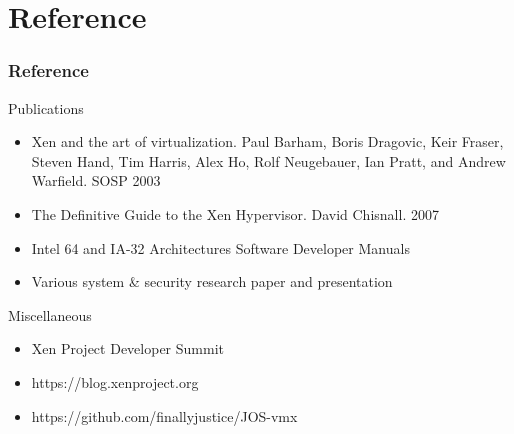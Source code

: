 \documentclass[aspectratio=169]{beamer}
\begin{document}
\section {Reference}
\begin{frame}
\frametitle{Reference}
\begin{block}{Publications}
\begin{itemize}
\item Xen and the art of virtualization. Paul Barham, Boris Dragovic, Keir Fraser, Steven Hand, Tim Harris, Alex Ho, Rolf Neugebauer, Ian Pratt, and Andrew Warfield. SOSP 2003
\item The Definitive Guide to the Xen Hypervisor. David Chisnall. 2007
\item Intel 64 and IA-32 Architectures Software Developer Manuals
\item Various system \& security research paper and presentation
\end{itemize}
\end{block}
\begin{block}{Miscellaneous}
\begin{itemize}
\item Xen Project Developer Summit
\item https://blog.xenproject.org
\item https://github.com/finallyjustice/JOS-vmx
\end{itemize}
\end{block}
\end{frame}

\end{document}
